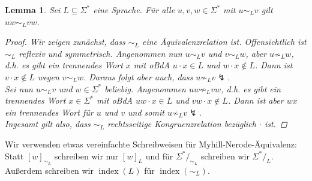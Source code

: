 \documentclass[11pt, a4paper]{article}
\theoremstyle{definition}
\theoremstyle{plain}
\newtheorem{lemma}[definition]{Lemma}
\numberwithin{equation}{section}
\DeclareMathOperator{\ind}{index}
\begin{document}
\begin{lemma}\label{lem:mncongruence}
	Sei $L \subseteq \Sigma^\ast$ eine Sprache. Für alle $u, v, w \in \Sigma^\ast$ mit $u \sim_L v$ gilt $uw \sim_L vw$.
	\begin{proof}
		Wir zeigen zunächst, dass $\sim_L$ eine Äquivalenzrelation ist. Offensichtlich ist $\sim_L$ reflexiv und symmetrisch. Angenommen nun $u \sim_L v$ und $v \sim_L w$, aber $u \not\sim_L w$, d.h. es gibt ein trennendes Wort $x$ mit oBdA $u \cdot x \in L$ und $w \cdot x \notin L$. Dann ist $v \cdot x \notin L$ wegen $v \sim_L w$. Daraus folgt aber auch, dass $u \not\sim_L v \lightning$.\\
		Sei nun $u \sim_L v$ und $w \in \Sigma^\ast$ beliebig. Angenommen $uw \not\sim_L vw$, d.h. es gibt ein trennendes Wort $x \in \Sigma^\ast$ mit oBdA $uw \cdot x \in L$ und $vw \cdot x \notin L$. Dann ist aber $wx$ ein trennendes Wort für $u$ und $v$ und somit $u \not\sim_L v \lightning$.\\
		Ingesamt gilt also, dass $\sim_L$ rechtsseitige Kongruenzrelation bezüglich $\cdot$ ist.
	\end{proof}
\end{lemma}
Wir verwenden etwas vereinfachte Schreibweisen für Myhill-Nerode-Äquivalenz: Statt $[w]_{\sim_L}$ schreiben wir nur $[w]_L$ und für $\Sigma^\ast /_{\sim_L}$ schreiben wir $\Sigma^\ast /_L$. Außerdem schreiben wir $\ind(L)$ für $\ind(\sim_L)$.
\end{document}
